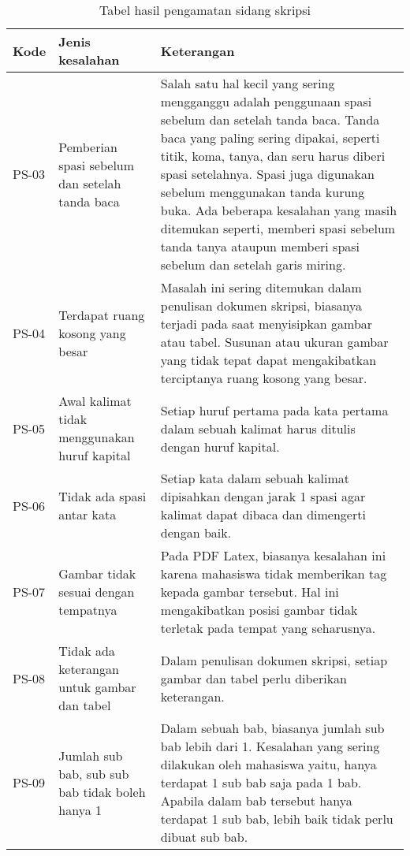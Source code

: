 \begin{table}[H]
	\renewcommand{\arraystretch}{1.5}
	\caption {Tabel hasil pengamatan sidang skripsi} \label{tab:hasil_sidang2}
	\begin{center}
		\begin{tabular}{|p{1.5 cm}|>{\raggedright} p{5.5 cm}| p{7.5 cm}|}
		\hline
		Kode & Jenis kesalahan & Keterangan \\ 
		\hline		
		PS-03 & Pemberian spasi sebelum dan setelah tanda baca & Salah satu hal kecil yang sering mengganggu adalah penggunaan spasi sebelum dan setelah tanda baca. Tanda baca yang paling sering dipakai, seperti titik, koma, tanya, dan seru harus diberi spasi setelahnya. Spasi juga digunakan sebelum menggunakan tanda kurung buka. Ada beberapa kesalahan yang masih ditemukan seperti, memberi spasi sebelum tanda tanya ataupun memberi spasi sebelum dan setelah garis miring. \newline \\ 
		\hline
		PS-04 & Terdapat ruang kosong yang besar & Masalah ini sering ditemukan dalam penulisan dokumen skripsi, biasanya terjadi pada saat menyisipkan gambar atau tabel. Susunan atau ukuran gambar yang tidak tepat dapat mengakibatkan terciptanya ruang kosong yang besar. \newline \\
		\hline 
		PS-05 & Awal kalimat tidak menggunakan huruf kapital & Setiap huruf pertama pada kata pertama dalam sebuah kalimat harus ditulis dengan huruf kapital. \newline \\  
		\hline 
		PS-06 & Tidak ada spasi antar kata & Setiap kata dalam sebuah kalimat dipisahkan dengan jarak 1 spasi agar kalimat dapat dibaca dan dimengerti dengan baik. \newline \\ 
		\hline 
		PS-07 & Gambar tidak sesuai dengan tempatnya & Pada PDF Latex, biasanya kesalahan ini karena mahasiswa tidak memberikan tag kepada gambar tersebut. Hal ini mengakibatkan posisi gambar tidak terletak pada tempat yang seharusnya. \newline \\ 
		\hline 
		PS-08 & Tidak ada keterangan untuk gambar dan tabel & Dalam penulisan dokumen skripsi, setiap gambar dan tabel perlu diberikan keterangan.
 \newline \\ 
		\hline 
		PS-09 & Jumlah sub bab, sub sub bab tidak boleh hanya 1 & Dalam sebuah bab, biasanya jumlah sub bab lebih dari 1. Kesalahan yang sering dilakukan oleh mahasiswa yaitu, hanya terdapat 1 sub bab saja pada 1 bab. Apabila dalam bab tersebut hanya terdapat 1 sub bab, lebih baik tidak perlu dibuat sub bab. \newline \\ 
		\hline 
		\end{tabular}
	\end{center}
\end{table}

